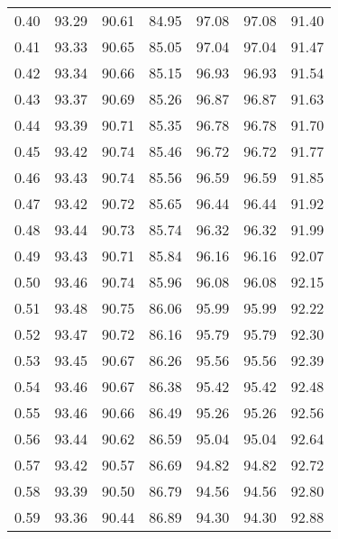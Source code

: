 \begin{tabular}{|c|c|c|c|c|c|c|}
      0.40 &     93.29 &     90.61 &      84.95 &   97.08 &      97.08 &         91.40 \\
      0.41 &     93.33 &     90.65 &      85.05 &   97.04 &      97.04 &         91.47 \\
      0.42 &     93.34 &     90.66 &      85.15 &   96.93 &      96.93 &         91.54 \\
      0.43 &     93.37 &     90.69 &      85.26 &   96.87 &      96.87 &         91.63 \\
      0.44 &     93.39 &     90.71 &      85.35 &   96.78 &      96.78 &         91.70 \\
      0.45 &     93.42 &     90.74 &      85.46 &   96.72 &      96.72 &         91.77 \\
      0.46 &     93.43 &     90.74 &      85.56 &   96.59 &      96.59 &         91.85 \\
      0.47 &     93.42 &     90.72 &      85.65 &   96.44 &      96.44 &         91.92 \\
      0.48 &     93.44 &     90.73 &      85.74 &   96.32 &      96.32 &         91.99 \\
      0.49 &     93.43 &     90.71 &      85.84 &   96.16 &      96.16 &         92.07 \\
      0.50 &     93.46 &     90.74 &      85.96 &   96.08 &      96.08 &         92.15 \\
      0.51 &     93.48 &     90.75 &      86.06 &   95.99 &      95.99 &         92.22 \\
      0.52 &     93.47 &     90.72 &      86.16 &   95.79 &      95.79 &         92.30 \\
      0.53 &     93.45 &     90.67 &      86.26 &   95.56 &      95.56 &         92.39 \\
      0.54 &     93.46 &     90.67 &      86.38 &   95.42 &      95.42 &         92.48 \\
      0.55 &     93.46 &     90.66 &      86.49 &   95.26 &      95.26 &         92.56 \\
      0.56 &     93.44 &     90.62 &      86.59 &   95.04 &      95.04 &         92.64 \\
      0.57 &     93.42 &     90.57 &      86.69 &   94.82 &      94.82 &         92.72 \\
      0.58 &     93.39 &     90.50 &      86.79 &   94.56 &      94.56 &         92.80 \\
      0.59 &     93.36 &     90.44 &      86.89 &   94.30 &      94.30 &         92.88 \\

\end{tabular}
